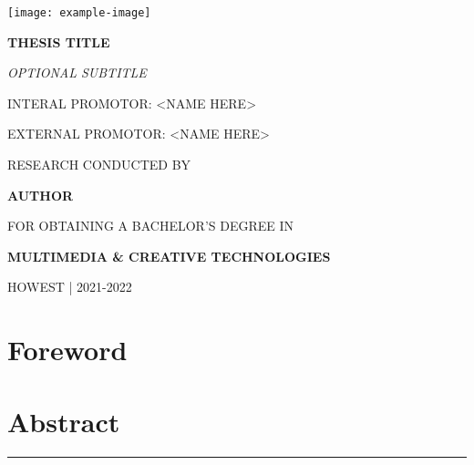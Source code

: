 \documentclass{article}
\makeatletter
\renewcommand\tableofcontents{%
  \null\hfill\textbf{\Huge\contentsname}\hfill\null\par
  \vline\noexpand\rule{\textwidth}{1pt}%
  \@mkboth{\MakeUppercase\contentsname}{\MakeUppercase\contentsname}%
  \@starttoc{toc}%
}
\makeatother
\begin{document}
\begin{titlepage}
    \begin{center}
        \texttt{[image: example-image]}
    \end{center}
    \begin{adjustwidth}{1.5cm}{1.5cm}

    \vspace{0.5em}

    \MakeUppercase{\huge\textbf{Thesis title}}

    \MakeUppercase{\Large\textit{Optional subtitle}}

    \vspace{1em}

    \MakeUppercase{Interal promotor: <name here>}

    \MakeUppercase{External promotor: <name here>}

    \vspace{1em}

    \MakeUppercase{\small{Research conducted by}}

    \MakeUppercase{\Large\textbf{{Author}}}

    \MakeUppercase{\small{for obtaining a bachelor's degree in}}

    \MakeUppercase{\Large{\textbf{{Multimedia \& Creative Technologies}}}}

    \MakeUppercase{Howest | 2021-2022}
    \end{adjustwidth}
\end{titlepage}




\section*{Foreword}
\newpage

\section*{Abstract}
\newpage

\tableofcontents
\newpage

\newpage
\end{document}
